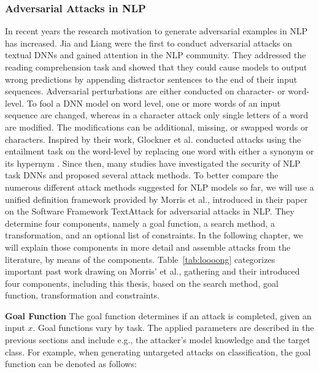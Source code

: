 
\subsubsection{Adversarial Attacks in NLP}
\label{sec:adv-ex_in_NLP}

In recent years the research motivation to generate adversarial examples in NLP has increased. Jia and Liang were the first to conduct adversarial attacks on textual DNNs and gained attention in the NLP community\cite{Jia2017AdversarialEF}. They addressed the reading comprehension task and showed that they could cause models to output wrong predictions by appending distractor sentences to the end of their input sequences.
Adversarial perturbations are either conducted on character- or word-level. To fool a DNN model on word level, one or more words of an input sequence are changed, whereas in a character attack only single letters of a word are modified. The modifications can be additional, missing, or swapped words or characters. 
Inspired by their work, Glockner et al. conducted attacks using the entailment task on the word-level by replacing one word with either a synonym or its hypernym \cite{glockner2018breaking}. Since then, many studies have investigated the security of NLP task DNNs and proposed several attack methods. 
To better compare the numerous different attack methods suggested for NLP models so far, we will use a unified definition framework provided by Morris et al., introduced in their paper on the Software Framework TextAttack for adversarial attacks in NLP\cite{morris2020textattack}. They determine four components, namely a goal function, a search method, a transformation, and an optional list of constraints. In the following chapter, we will explain those components in more detail and assemble attacks from the literature, by means of the components.
Table~\ref{tab:loooong} categorizes important past work drawing on Morris' et al., gathering and their introduced four components, including this thesis, based on the search method, goal function, transformation and constraints.

\textbf{Goal Function}
\label{sec:goal_funciton}
The goal function determines if an attack is completed, given an input $x$. 
Goal functions vary by task. The applied parameters are described in the previous sections and include e.g., the attacker's model knowledge and the target class.
For example, when generating untargeted attacks on classification, the goal function can be denoted as follows:

